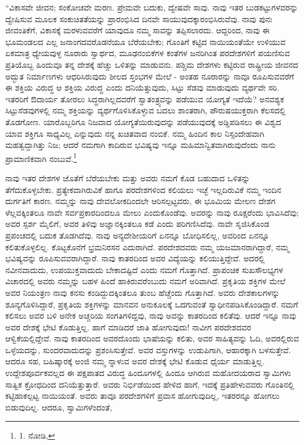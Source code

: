“ವಿಕಾಸವೇ ಜೀವನ; ಸಂಕೋಚವೇ ಮರಣ. ಪ್ರೇಮವೇ ಬದುಕು, ದ್ವೇಷವೇ ಸಾವು. ನಾವು ಇತರ ಬುಡಕಟ್ಟುಗಳವರನ್ನು ದ್ವೇಷಿಸುವ ಮೂಲಕ ಸಂಕುಚಿತತೆಯನ್ನು ಪ್ರಾರಂಭಿಸಿದ ದಿನವೇ ಸಾಯುವುದಕ್ಕಾರಂಭಿಸಿರುವೆವು. ನಾವು ಪುನಃ ಜೀವಂತಿಕೆಗೆ, ವಿಕಾಸಕ್ಕೆ ಮರಳುವವರೆಗೆ ಯಾವುದೂ ನಮ್ಮ ಸಾವನ್ನು ತಪ್ಪಿಸಲಾರದು. ಆದ್ದರಿಂದ, ನಾವು ಈ ಭೂಮಂಡಲದ ಎಲ್ಲ ಜನಾಂಗದವರೊಡನೆಯೂ ಬೆರೆಯಬೇಕು; ಗೊಂತಿಗೆ ಕಟ್ಟಿದ ನಾಯಿಯಂತೆಯೇ ಉಳಿಯುವ ಏಕಮಾತ್ರ ಧ್ಯೇಯವುಳ್ಳ ನೂರಾರು ಸ್ವಾರ್ಥದ, ಮೂಢನಂಬಿಕೆಗಳ ಕಂತೆಗಳ ಜನರಿಗಿಂತ ಪರದೇಶಗಳಿಗೆ ಪಯಣಿಸುವ ಪ್ರತಿಯೊಬ್ಬ ಹಿಂದುವೂ ತನ್ನ ದೇಶಕ್ಕೆ ಹೆಚ್ಚು ಒಳಿತನ್ನು ಮಾಡುವನು. ಪಶ್ಚಿಮ ದೇಶಗಳು ಕಟ್ಟಿರುವ ರಾಷ್ಟ್ರೀಯ ಜೀವನದ ಅದ್ಭುತ ನಿರ್ಮಾಣಗಳು ಆಧರಿಸಿರುವುದು ಶೀಲದ ಸ್ತಂಭಗಳ ಮೇಲೆ - ಅಂತಹ ನೂರಾರನ್ನು ನಾವೂ ರೂಪಿಸುವವರೆಗೆ ಈ ಶಕ್ತಿಯ ವಿರುದ್ಧ ಆ ಶಕ್ತಿಯ ವಿರುದ್ಧ ಎಂದು ದನಿಯೆತ್ತುವುದು, ಸಿಟ್ಟು ಸೆಡವು ಮಾಡುವುದು ವ್ಯರ್ಥವೇ ಸರಿ. ಇತರರಿಗೆ ಔದಾರ್ಯ ತೋರಲು ಸಿದ್ಧರಾಗಿಲ್ಲದವರೆಗೆ ಸ್ವಾತಂತ್ರ್ಯವನ್ನು ಪಡೆಯುವ ಯೋಗ್ಯತೆ ಇದೆಯೆ? ಅನವಶ್ಯಕ ಸಿಟ್ಟುಸೆಡವುಗಳಲ್ಲಿ ನಮ್ಮ ಶಕ್ತಿಯನ್ನು ವ್ಯರ್ಥಗೊಳಿಸಿಕೊಳ್ಳುವ ಬದಲು ಶಾಂತರಾಗಿ, ಪೌರುಷಯುಕ್ತರಾಗಿ ಕೆಲಸದಲ್ಲಿ ತೊಡಗೋಣ. ಯಾರೊಬ್ಬರಿಗೂ ನಿಜವಾದ ಯೋಗ್ಯತೆಯಿರುವುದನ್ನು ಪಡೆಯುವುದಕ್ಕೆ ಅಡ್ಡಿಪಡಿಸಲು ಈ ವಿಶ್ವದ ಯಾವ ಶಕ್ತಿಗೂ ಸಾಧ್ಯವಿಲ್ಲ ಎನ್ನುವುದು ನನ್ನ ಖಚಿತವಾದ ನಂಬಿಕೆ. ನಮ್ಮ ಹಿಂದಿನ ಕಾಲ ನಿಸ್ಸಂದೇಹವಾಗಿ ಮಹತ್ವದ್ದಾಗಿತ್ತು ನಿಜ; ಆದರೆ ನಮಗಾಗಿ ಕಾದಿರುವ ಭವಿಷ್ಯವು ಇನ್ನೂ ಮಹಿಮಾನ್ವಿತವಾಗಿರುವುದೆಂದು ನಾನು ಪ್ರಾಮಾಣಿಕವಾಗಿ ನಂಬುವೆ.\footnote{1. ನೋಡಿ, }

ನಾವು ಇತರ ದೇಶಗಳ ಜೊತೆಗೆ ಬೆರೆಯಬೇಕು ಮತ್ತು ಅವರು ನಮಗೆ ಕೊಡ ಬಹುದಾದ ಒಳಿತನ್ನು ತೆಗೆದುಕೊಳ್ಳಬೇಕು. ಪ್ರತ್ಯೇಕವಾಗಿರುವಿಕೆ ಹಾಗೂ ಪರದೇಶಗಳಿಂದ ಕಲಿಯಲು ಇಚ್ಛೆ ಇಲ್ಲದಿರುವಿಕೆ ನಮ್ಮ ಇಂದಿನ ದುರ್ಗತಿಗೆ ಕಾರಣ. ನಮ್ಮನ್ನು ನಾವು ದೇವಲೋಕದಿಂದಲೇ ಆರಿಸಲ್ಪಟ್ಟವರು, ಈ ಭೂಮಿಯ ಮೇಲಣ ದೇಶಗ ಳೆಲ್ಲವಕ್ಕಿಂತಲೂ ನಾವೇ ಸರ್ವಪ್ರಕಾರದಿಂದಲೂ ಮೇಲು ಎಂದುಕೊಂಡೆವು. ಅವರನ್ನು ನಾವು ರೂಕ್ಷರೆಂದು ಭಾವಿಸಿದೆವು; ಅವರ ಸ್ಪರ್ಶ ಮೈಲಿಗೆ, ಅವರ ತಿಳಿವು ಅಜ್ಞಾನಕ್ಕಿಂತಲೂ ಕಡೆ ಎಂದು ಪರಿಗಣಿಸಿದೆವು. ನಾವೇ ಸೃಜಿಸಿಕೊಂಡ ಪ್ರಪಂಚದಲ್ಲಿ ಬದುಕ ತೊಡಗಿದೆವು. ನಾವು ಅನ್ಯದೇಶೀಯರಿಗೆ ಏನನ್ನೂ ಬೋಧಿಸಲಿಲ್ಲ, ಅವರಿಂದ ಏನನ್ನೂ ಕಲಿತುಕೊಳ್ಳಲಿಲ್ಲ. ಕೊಟ್ಟಕೊನೆಗೆ ಭ್ರಮನಿರಸನ ಎದುರಾಗಿದೆ. ಪರದೇಶದವರು ನಮ್ಮ ಯಜಮಾನರಾಗಿದ್ದಾರೆ, ನಮ್ಮ ಭವಿಷ್ಯವನ್ನು ರೂಪಿಸುವವರಾಗಿದ್ದಾರೆ. ನಾವು ಕಾತರದಿಂದ ಅವರ ವಿದ್ಯೆಯನ್ನು ಕಲಿಯುತ್ತಿದ್ದೇವೆ. ಅದರಲ್ಲಿ ನವೀನವಾದುದು, ಉಪಯುಕ್ತವಾದುದು ಬೇಕಾದಷ್ಟಿದೆ ಎಂದು ನಮಗೆ ಗೊತ್ತಾಗಿದೆ. ಪ್ರಾಪಂಚಿಕ ಸುಖಸೌಲಭ್ಯಗಳ ವಿಚಾರದಲ್ಲಿ ಅವರು ನಮ್ಮನ್ನು ಬಹಳ ಹಿಂದೆ ಹಾಕಿರುವರೆಂಬುದು ನಮಗೆ ಅರಿವಾಗಿದೆ. ಪ್ರಕೃತಿಯ ಶಕ್ತಿಗಳ ಮೇಲೆ ಅವರ ನಿಯಂತ್ರಣ ನಾವು ಕನಸು ಕಂಡಿದ್ದುದಕ್ಕಿಂತಲೂ ತುಂಬ ಹೆಚ್ಚೆಂದು ಗೊತ್ತಾಗಿದೆ. ಅವರು ದೇಶಕಾಲಗಳನ್ನು ಶೂನ್ಯಗೊಳಿಸಿದ್ದಾರೆ, ಪ್ರಕೃತಿಯ ಶಕ್ತಿಗಳನ್ನು ಮಾನವನ ಅನುಕೂಲಕ್ಕೆ ಒದಗುವಂತೆ ಸ್ವಾಧೀನಪಡಿಸಿಕೊಂಡಿದ್ದಾರೆ. ನಮಗೆ ಕಲಿಸಲು ಅವರ ಬಳಿ ಅನೇಕ ಅಚ್ಚರಿಯ ಸಂಗತಿಗಳಿದ್ದವು, ನಾವು ಅವನ್ನು ಕಾತರದಿಂದ ಕಲಿತೆವು. ಆದರೆ ಇನ್ನೂ ನಾವು ಅವರ ದೇಶಕ್ಕೆ ಭೇಟಿ ಕೊಡುತ್ತಿಲ್ಲ. ಹಾಗೆ ಮಾಡಿದರೆ ಜಾತಿ ಹೋಗುವುದು! ನಾವೀಗ ಪರದೇಶದವರ ಆಳ್ವಿಕೆಯಲ್ಲಿದ್ದೇವೆ. ನಾವು ಕಾತರದಿಂದ ಅವರದೊಂದು ಭಾಷೆಯನ್ನು ಕಲಿತು, ಅವರ ಸಾಹಿತ್ಯವನ್ನು ಓದಿ, ಅವರಲ್ಲಿರುವ ಒಳ್ಳೆಯದನ್ನು, ಸುಂದರವಾದುದನ್ನು ಪ್ರಶಂಸಿಸುತ್ತೇವೆ. ಅವರ ವಸ್ತುಗಳನ್ನು ಉಡುಪಿಗಾಗಿ, ಆಹಾರಕ್ಕಾಗಿ ಬಳಸುತ್ತೇವೆ. ಆದರೂ ಸಹ, ಬಹಿಷ್ಕಾರಕ್ಕೆ ಅಂಜಿ ನಮ್ಮ ನ್ನಾಳುವ ಅವರ ದೇಶಕ್ಕೆ ಭೇಟಿ ಕೊಡುವ ಧೈರ್ಯ ಮಾಡುತ್ತಿಲ್ಲ. ಉದ್ದೇಶಪೂರ್ವಕವಲ್ಲದ ಈ ಪಕ್ಷಪಾತದ ವಿರುದ್ಧ ಹಿಂದೂಗಳಲ್ಲಿ ಹಿಂದೂ ಆಗಿರುವ ಮಹೋದಯರಾದ ಸ್ವಾಮಿಗಳು ಸಾತ್ವಿಕ ಕ್ರೋಧದಿಂದ ದನಿಯೆತ್ತುತ್ತಾರೆ. ಅವರು ನಿರ್ಭಿಡೆಯಿಂದ ಹೇಳಿದ ಹಾಗೆ, ಇದಕ್ಕೆ ಪ್ರತಿಹೇಳುವವರು ಗೊಂತಿನಲ್ಲಿ ಕಟ್ಟಿಹಾಕಲ್ಪಟ್ಟ ನಾಯಿಯಂತೆ. ಅವರು ತಾವೂ ಪರದೇಶಗಳಿಗೆ ಪ್ರವಾಸ ಹೋಗುವುದಿಲ್ಲ, ಇತರರನ್ನೂ ಹೋಗಲು ಬಿಡುವುದಿಲ್ಲ. ಆದರೂ, ಸ್ವಾಮಿಗಳೆಂದಂತೆ,

